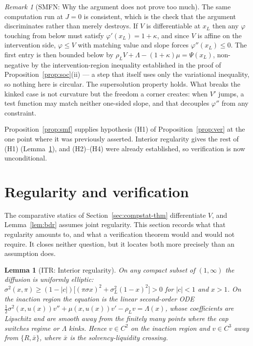 \documentclass[11pt]{article}
\newtheorem{lemma}{Lemma}
\theoremstyle{remark}
\newtheorem{remark}{Remark}
\begin{document}
\begin{remark}[SMFN: Why the argument does not prove too much]
\label{rem:smfn}
The same computation run at $J=0$ is consistent, which is the check that
the argument discriminates rather than merely destroys. If $V$ is
differentiable at $x_L$ then any $\varphi$ touching from below must satisfy
$\varphi'(x_L)=1+\kappa$, and since $V$ is affine on the intervention side,
$\varphi\le V$ with matching value and slope forces $\varphi''(x_L)\le0$.
The first entry is then bounded below by
$\rho_LV+\Lambda-(1+\kappa)\mu=\Psi(x_L)$, non-negative by the
intervention-region inequality established in the proof of
Proposition~\ref{prop:soc}(ii) --- a step that itself uses only the
variational inequality, so nothing here is circular. The supersolution property holds. What
breaks the kinked case is not curvature but the freedom a corner creates:
when $V'$ jumps, a test function may match neither one-sided slope, and
that decouples $\varphi''$ from any constraint.

Proposition~\ref{prop:smf} supplies hypothesis (H1) of
Proposition~\ref{prop:ver} at the one point where it was previously
asserted. Interior regularity gives the rest of (H1)
(Lemma~\ref{lem:itr}), and (H2)--(H4) were already established, so
verification is now unconditional.
\end{remark}

\section{Regularity and verification}
\label{sec:verification}

The comparative statics of Section~\ref{sec:compstat-thm} differentiate
$V$, and Lemma~\ref{lem:bdr} assumes joint regularity. This section
records what that regularity amounts to, and what a verification theorem
would and would not require. It closes neither question, but it locates
both more precisely than an assumption does.

\begin{lemma}[ITR: Interior regularity]
\label{lem:itr}
On any compact subset of $(1,\infty)$ the diffusion is uniformly elliptic:
$\sigma^2(x,\pi) \ge (1-|c|)\big[(\pi\sigma x)^2 + \sigma_L^2(1-x)^2\big] > 0$
for $|c|<1$ and $x>1$. On the inaction region the equation is the linear
second-order ODE
$\tfrac12\sigma^2(x,u(x))v'' + \mu(x,u(x))v' - \rho_L v = \Lambda(x)$,
whose coefficients are Lipschitz and are smooth away from the finitely
many points where the cap switches regime or $\Lambda$ kinks. Hence
$v \in C^2$ on the inaction region and $v \in C^3$ away from
$\{R, \bar x\}$, where $\bar x$ is the solvency-liquidity crossing.
\end{lemma}
\end{document}
